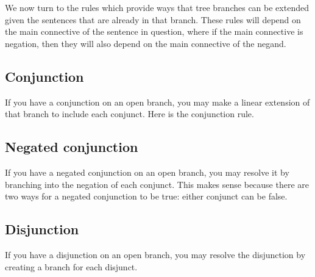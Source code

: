 We now turn to the  rules which provide ways that tree branches can be extended given the sentences that are already in that branch.
These rules will depend on the main connective of the sentence in question, where if the main connective is negation, then they will also depend on the main connective of the negand.




\label{SL.treerules.start}
\subsection{Conjunction}

If you have a conjunction on an open branch, you may make a linear extension of that branch to include each conjunct.
Here is the conjunction rule.





\subsection{Negated conjunction}

If you have a negated conjunction on an open branch, you may resolve it by branching into the negation of each conjunct.
This makes sense because there are two ways for a negated conjunction to be true: either conjunct can be false.





\subsection{Disjunction}
\label{subsec.DisjunctionTreeRule}
\begin{groupitems}

If you have a disjunction on an open branch, you may resolve the disjunction by creating a branch for each disjunct.

\end{groupitems}





